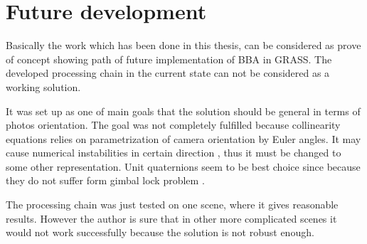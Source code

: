 \documentclass[a4paper,12pt]{article}
\begin{document}

\section{Future development}


Basically the work which has been done in this thesis, can be considered as prove of concept
showing path of future implementation of BBA in GRASS. The developed 
processing chain in the current state can not be considered as a working solution.

It was set up as one of main goals that the solution should be general in terms of photos orientation.
The goal was not completely fulfilled because collinearity equations relies on parametrization of camera orientation by Euler angles.
It may cause numerical instabilities in certain direction \label{sec:eo}, thus it must be changed to some other representation.
Unit quaternions seem to be best choice since because they do not suffer form gimbal lock problem \cite{schmidt2001using}.

The processing chain was just tested 
 on one scene, where it gives reasonable results. However 
the author is sure that in other more complicated scenes it would not work successfully because 
the solution is not robust enough.
\end{document}
